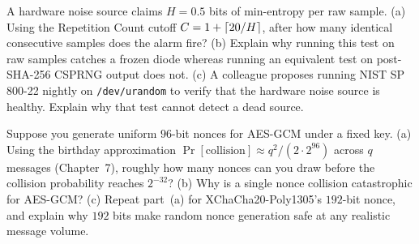 \begin{exercise}
A hardware noise source claims $H = 0.5$ bits of min-entropy per raw sample. (a) Using the Repetition Count cutoff $C = 1 + \lceil20/H\rceil$, after how many identical consecutive samples does the alarm fire? (b) Explain why running this test on raw samples catches a frozen diode whereas running an equivalent test on post-SHA-256 CSPRNG output does not. (c) A colleague proposes running NIST SP 800-22 nightly on \texttt{/dev/urandom} to verify that the hardware noise source is healthy. Explain why that test cannot detect a dead source.
\end{exercise}

\begin{exercise}
Suppose you generate uniform $96$-bit nonces for AES-GCM under a fixed key. (a) Using the birthday approximation $\Pr[\text{collision}] \approx q^2 / (2 \cdot 2^{96})$ across $q$ messages (Chapter~7), roughly how many nonces can you draw before the collision probability reaches $2^{-32}$? (b) Why is a single nonce collision catastrophic for AES-GCM? (c) Repeat part~(a) for XChaCha20-Poly1305's $192$-bit nonce, and explain why $192$ bits make random nonce generation safe at any realistic message volume.
\end{exercise}
